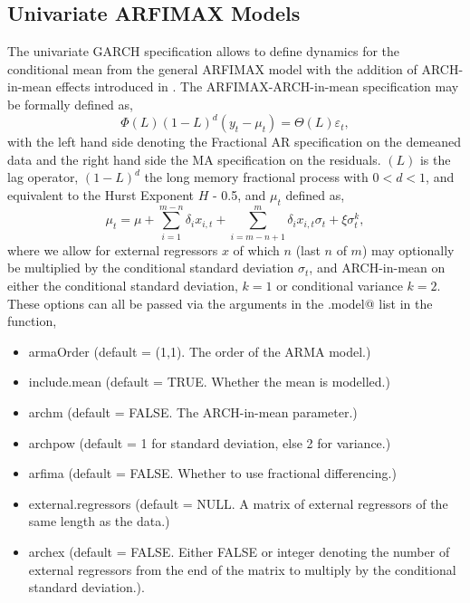 \subsection{Univariate ARFIMAX Models}\label{section:umean}
The univariate GARCH specification allows to define dynamics for the conditional
mean from the general ARFIMAX model with the addition of ARCH-in-mean effects
introduced in \citet{EngleLilienRobbins}.
The ARFIMAX-ARCH-in-mean specification may be formally defined as,
\begin{equation}\label{arfimax1}
\Phi(L){(1 - L)^d}({y_t} - {\mu _t}) = \Theta (L){\varepsilon _t},
\end{equation}
with the left hand side denoting the Fractional AR specification on the demeaned
data and the right hand side the MA specification on the residuals. $(L)$ is the
lag operator, $(1 - L)^d$ the long memory fractional process with $0 < d < 1$,
and equivalent to the Hurst Exponent $H$ - 0.5, and $\mu_t$ defined as,
\begin{equation}\label{arfimax2}
{\mu _t} = \mu  + \sum\limits_{i = 1}^{m - n} {{\delta _i}} {x_{i,t}} + \sum\limits_{i = m - n + 1}^m {\delta _i}{x_{i,t}}{\sigma _t} + \xi \sigma _t^k,
\end{equation}
where we allow for \verb@m@ external regressors $x$ of which $n$ (last $n$ of $m$) may optionally be multiplied by the conditional standard deviation $\sigma_t$, 
and ARCH-in-mean on either the conditional standard deviation, $k=1$ or conditional variance $k=2$. These options can all be passed via the arguments in the \verb@mean.model@ list
in the \verb@ugarchspec@ function,
\begin{itemize}
\item armaOrder 	   (default = (1,1). The order of the ARMA model.)
\item include.mean 	   (default = TRUE.  Whether the mean is modelled.)
\item archm			   (default = FALSE. The ARCH-in-mean parameter.)
\item archpow   	   (default = 1 for standard deviation, else 2 for variance.)
\item arfima	   	   (default = FALSE. Whether to use fractional differencing.)
\item external.regressors (default = NULL. A matrix of external regressors of
the same length as the data.)
\item archex           (default = FALSE. Either FALSE or integer denoting the number of external
regressors from the end of the matrix to multiply by the conditional standard deviation.).
\end{itemize}
